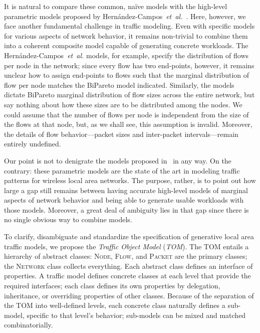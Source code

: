 \documentclass[conference]{IEEEtran}
\newcommand{\caps}[1]{{\small{#1}}}
\newcommand{\FHC}{Hern\'andez-Campos~\textit{et~al.}}
\newcommand{\class}[1]{\textsc{\small{#1}}}
\begin{document}
It is natural to compare these common, na\"ive models with the high-level parametric models proposed by \FHC~\cite{Hernandez06:wlan-traffic}. Here, however, we face another fundamental challenge in traffic modeling. Even with specific models for various aspects of network behavior, it remains non-trivial to combine them into a coherent composite model capable of generating concrete workloads. The {\FHC} models, for example, specify the distribution of flows per node in the network; since every flow has two end-points, however, it remains unclear how to assign end-points to flows such that the marginal distribution of flow per node matches the BiPareto model indicated. Similarly, the models dictate BiPareto marginal distribution of flow sizes across the entire network, but say nothing about how these sizes are to be distributed among the nodes. We could assume that the number of flows per node is independent from the size of the flows at that node, but, as we shall see, this assumption is invalid. Moreover, the details of flow behavior---packet sizes and inter-packet intervals---remain entirely undefined.

Our point is not to denigrate the models proposed in~\cite{Hernandez06:wlan-traffic} in any way. On the contrary: these parametric models are the state of the art in modeling traffic patterns for wireless local area networks. The purpose, rather, is to point out how large a gap still remains between having accurate high-level models of marginal aspects of network behavior and being able to generate usable workloads with those models. Moreover, a great deal of ambiguity lies in that gap since there is no single obvious way to combine models.

To clarify, disambiguate and standardize the specification of generative local area traffic models, we propose the \textit{Traffic Object Model} (\textit{\caps{TOM}}). The \caps{TOM} entails a hierarchy of abstract classes: \class{Node}, \class{Flow}, and \class{Packet} are the primary classes; the \class{Network} class collects everything. Each abstract class defines an interface of properties. A traffic model defines concrete classes at each level that provide the required interfaces; each class defines its own properties by delegation, inheritance, or overriding properties of other classes. Because of the separation of the \caps{TOM} into well-defined levels, each concrete class naturally defines a sub-model, specific to that level's behavior; sub-models can be mixed and matched combinatorially.
\end{document}
